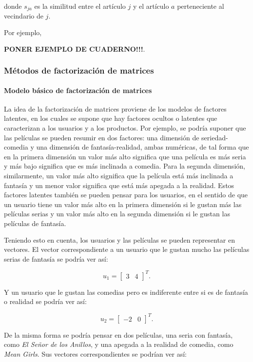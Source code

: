 donde $s_{ja}$ es la similitud entre el artículo $j$ y el artículo $a$ perteneciente al vecindario de $j$.

Por ejemplo,

\textbf{PONER EJEMPLO DE CUADERNO!!!}.

\subsubsection{Métodos de factorización de matrices}

\paragraph{Modelo básico de factorización de matrices}

La idea de la factorización de matrices proviene de los modelos de factores latentes, en los cuales se supone que hay factores ocultos o latentes que caracterizan a los usuarios y a los productos. Por ejemplo, se podría suponer que las películas se pueden resumir en dos factores: una dimensión de seriedad-comedia y una dimensión de fantasía-realidad, ambas numéricas, de tal forma que en la primera dimensión un valor más alto significa que una película es más seria y más bajo significa que es más inclinada a comedia. Para la segunda dimensión, similarmente, un valor más alto significa que la película está más inclinada a fantasía y un menor valor significa que está más apegada a la realidad. Estos factores latentes también se pueden pensar para los usuarios, en el sentido de que un usuario tiene un valor más alto en la primera dimensión si le gustan más las películas serias y un valor más alto en la segunda dimensión si le gustan las películas de fantasía.

Teniendo esto en cuenta, los usuarios y las películas se pueden representar en vectores. El vector correspondiente a un usuario que le gustan mucho las películas serias de fantasía se podría ver así:

\[
     u_1 = 
    \begin{bmatrix}
        3 & 4
    \end{bmatrix}^{T}.
\]
  
Y un usuario que le gustan las comedias pero es indiferente entre si es de fantasía o realidad se podría ver así:

\[
     u_2 = 
     \begin{bmatrix}
         -2 & 0
    \end{bmatrix}^{T}.
\]
  
De la misma forma se podría pensar en dos películas, una seria con fantasía, como \textit{El Señor de los Anillos}, y una apegada a la realidad de comedia, como \textit{Mean Girls}. Sus vectores correspondientes se podrían ver así:

